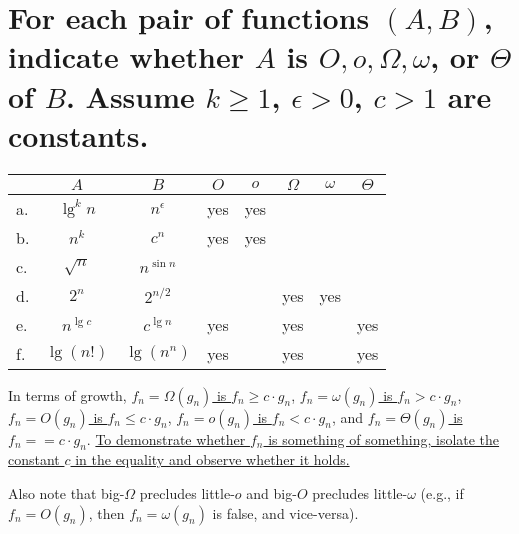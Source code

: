 \section[Problem 5]{For each pair of functions $(A, B)$, indicate whether $A$ is $O, o, \Omega, \omega$, or $\Theta$ of $B$. Assume $k \geq 1$, $\epsilon > 0$, $c > 1$ are constants.}

\begin{center}
	\begin{tabular}{lcc|c|c|c|c|c}
		& $A$ & $B$ & $O$ & $o$ & $\Omega$ & $\omega$ & $\Theta$ \\ \hline
		a. & $\lg^k n$ & $n^{\epsilon}$ & yes & yes &  &  &  \\ \hline
		b. & $n^k$ & $c^n$				& yes & yes &  &  &  \\ \hline
		c. & $\sqrt{n}$ & $n^{\sin n}$	&  &  &  &  &  \\ \hline
		d. & $2^n$ & $2^{n/2}$			&  &  & yes & yes &  \\ \hline
		e. & $n^{\lg c}$ & $c^{\lg n}$	& yes &  & yes &  & yes \\ \hline
		f. & $\lg(n!)$ & $\lg(n^n)$		& yes &  & yes &  & yes 
	\end{tabular}
\end{center}

\noindent
In terms of growth,
\ul{$f_n = \Omega(g_n)$ is	$f_n \geq c \cdot g_n$},
\ul{$f_n = \omega(g_n)$ is	$f_n > c \cdot g_n$},
\ul{$f_n = O(g_n)$ is		$f_n \leq c \cdot g_n$},
\ul{$f_n = o(g_n)$ is		$f_n < c \cdot g_n$}, and
\ul{$f_n = \Theta(g_n)$ is	$f_n == c \cdot g_n$}.
\ul{To demonstrate whether $f_n$ is something of something, isolate the constant $c$ in the equality and observe whether it holds.} 

Also note that big-$\Omega$ precludes little-$o$ and big-$O$ precludes little-$\omega$ (e.g., if $f_n = O(g_n)$, then $f_n = \omega(g_n)$ is false, and vice-versa).
